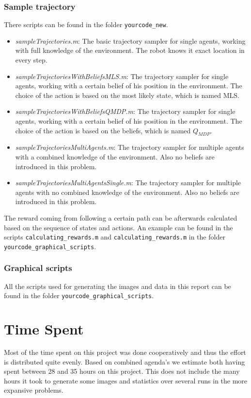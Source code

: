 \documentclass[10pt,a4paper]{article}
\begin{document}
\subsubsection*{Sample trajectory}
There scripts can be found in the folder \texttt{yourcode\_new}.
\begin{itemize}
	\item \emph{sampleTrajectories.m}: The basic trajectory sampler for single agents, working with full knowledge of the environment. The robot knows it exact location in every step.
	\item \emph{sampleTrajectoriesWithBeliefsMLS.m}: The trajectory sampler for single agents, working with a certain belief of his position in the environment. The choice of the action is based on the most likely state, which is named MLS.
	\item \emph{sampleTrajectoriesWithBeliefsQMDP.m}: The trajectory sampler for single agents, working with a certain belief of his position in the environment. The choice of the action is based on the beliefs, which is named $Q_{MDP}$.
	\item \emph{sampleTrajectoriesMultiAgents.m}: The trajectory sampler for multiple agents with a combined knowledge of the environment. Also no beliefs are introduced in this problem.
	\item \emph{sampleTrajectoriesMultiAgentsSingle.m}: The trajectory sampler for multiple agents with no combined knowledge of the environment. Also no beliefs are introduced in this problem.
\end{itemize}

The reward coming from following a certain path can be afterwards calculated based on the sequence of states and actions. An example can be found in the scripts \texttt{calculating\_rewards.m} and \texttt{calculating\_rewards.m} in the folder \texttt{yourcode\_graphical\_scripts}.

\subsubsection*{Graphical scripts}
All the scripts used for generating the images and data in this report can be found in the folder \texttt{yourcode\_graphical\_scripts}.


\section{Time Spent}
Most of the time spent on this project was done cooperatively and thus the effort is distributed quite evenly.
Based on combined agenda's we estimate both having spent between 28 and 35 hours on this project. 
This does not include the many hours it took to generate some images and statistics over several runs in the more expansive problems.
\end{document}
